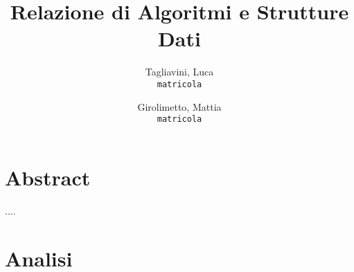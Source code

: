 \documentclass{article}
\title{\textbf{Relazione di Algoritmi e Strutture Dati}}
\author{
  Tagliavini, Luca\\
  \texttt{matricola}
  \and
  Girolimetto, Mattia\\
  \texttt{matricola}
}
\begin{document}
\maketitle
\tableofcontents
\pagebreak

\section{Abstract}

....

\section{Analisi}
\end{document}
